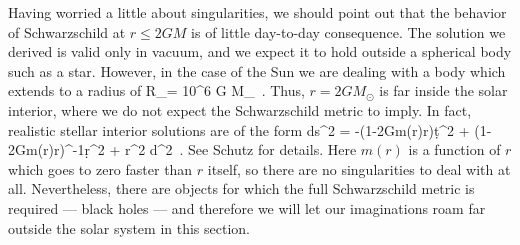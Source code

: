 Having worried a little about singularities, we should point out that
the behavior of Schwarzschild at $r\leq 2GM$ is of little day-to-day
consequence.  The solution we derived is valid only in vacuum, and
we expect it to hold outside a spherical body such as a star.  However,
in the case of the Sun we are dealing with a body which extends to a
radius of
\be
  R_\odot = 10^6 G M_\odot\ .\label{7.31}
\ee
Thus, $r=2GM_\odot$ is far inside the solar interior, where we do not
expect the Schwarzschild metric to imply.  In fact, realistic stellar
interior solutions are of the form
\be
  ds^2 = -\left(1-{{2Gm(r)}\over r}\right)\d t^2 + 
  \left(1-{{2Gm(r)}\over r}\right)^{-1}\d r^2
  + r^2 d\Omega^2\ .\label{7.32}
\ee
See Schutz for details.  Here $m(r)$ is a function of $r$ which goes
to zero faster than $r$ itself, so there are no singularities to 
deal with at all.  Nevertheless, there are objects for which the
full Schwarzschild metric is required --- black holes --- and therefore
we will let our imaginations roam far outside the solar system in this
section.

